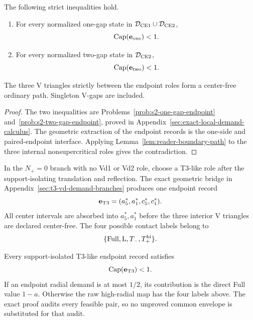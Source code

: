 \begin{proposition}
\label{prop:body-all-vd0-endpoints}
The following strict inequalities hold.

\begin{enumerate}
\item For every normalized one-gap state in
$\mathcal D_{\rm CE1}\cup\mathcal D_{\rm CE2}$,
\[
 \mathrm{Cap}(\mathbf e_{\rm one})<1.
\]
\item For every normalized two-gap state in $\mathcal D_{\rm CE2}$,
\[
 \mathrm{Cap}(\mathbf e_{\rm two})<1.
\]
\end{enumerate}

The three V triangles strictly between the endpoint roles form a center-free
ordinary path.  Singleton V-gaps are included.
\end{proposition}

\begin{proof}
The two inequalities are Problems~\ref{prob:s2-one-gap-endpoint} and~\ref{prob:s2-two-gap-endpoint}, proved in
Appendix~\ref{sec:exact-local-demand-calculus}.  The geometric extraction of
the endpoint records is the one-side and paired-endpoint interface.  Applying
Lemma~\ref{lem:reader-boundary-path} to the three internal nonsupercritical
roles gives the contradiction.
\end{proof}

\begin{definition}
\label{def:body-t3-endpoint-state}
In the $N_+=0$ branch with no Vd1 or Vd2 role, choose a T3-like role after the
support-isolating translation and reflection.  The exact geometric bridge in
Appendix~\ref{sec:t3-vd-demand-branches} produces one endpoint record
\[
 \mathbf e_{\rm T3}
 =(a_5^\ast,a_1^\ast,c_5^\ast,c_1^\ast).
\]
All center intervals are absorbed into $a_5^\ast,a_1^\ast$ before the three
interior V triangles are declared center-free.  The four possible contact
labels belong to
\[
 \{\mathrm{Full},\mathrm L,T_-,T_+^{\rm hi}\}.
\]
\end{definition}

\begin{proposition}
\label{prop:body-t3-endpoint}
Every support-isolated T3-like endpoint record satisfies
\[
 \mathrm{Cap}(\mathbf e_{\rm T3})<1.
\]
If an endpoint radial demand is at most $1/2$, its contribution is the direct
Full value $1-a$.  Otherwise the raw high-radial map has the four labels above.
The exact proof audits every feasible pair, so no unproved common envelope is
substituted for that audit.
\end{proposition}

